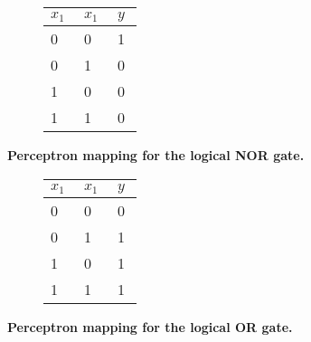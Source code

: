 \begin{figure}[!htp]
    \centering
    \begin{subfigure}[b]{0.70\textwidth}
        \centering
        
        \captionsetup{format=hang} %
        \label{fig:perceptron:nor:mapping}
    \end{subfigure}\hfil
    \begin{subfigure}[b]{0.29\textwidth}
        \centering
        \renewcommand{\arraystretch}{1.5}
        \begin{tabular}{C{0.1\linewidth}C{0.1\linewidth}|C{0.1\linewidth}}
            \hline
            $x_1$ & $x_1$ & $y$ \\      & 0     & 1   \\
            0     & 1     & 0   \\
            1     & 0     & 0   \\
            1     & 1     & 0
        \end{tabular}
        \vspace{0.5cm}
        \label{fig:perceptron:nor:truth}
    \end{subfigure}\hfil
    \captionsetup{format=hang} %
    \caption{
        \textbf{Perceptron mapping for the logical NOR gate.}
    }
    \label{fig:perceptron:nor}
\end{figure}

\begin{figure}[!htp]
    \centering
    \begin{subfigure}[b]{0.70\textwidth}
        \centering
        
        \captionsetup{format=hang} %
        \label{fig:perceptron:or:mapping}
    \end{subfigure}\hfil
    \begin{subfigure}[b]{0.29\textwidth}
        \centering
        \renewcommand{\arraystretch}{1.5}
        \begin{tabular}{C{0.1\linewidth}C{0.1\linewidth}|C{0.1\linewidth}}
            \hline
            $x_1$ & $x_1$ & $y$ \\      & 0     & 0   \\
            0     & 1     & 1   \\
            1     & 0     & 1   \\
            1     & 1     & 1
        \end{tabular}
        \vspace{0.5cm}
        \label{fig:perceptron:or:truth}
    \end{subfigure}\hfil
    \captionsetup{format=hang} %
    \caption{
        \textbf{Perceptron mapping for the logical OR gate.}
    }
    \label{fig:perceptron:or}
\end{figure}

